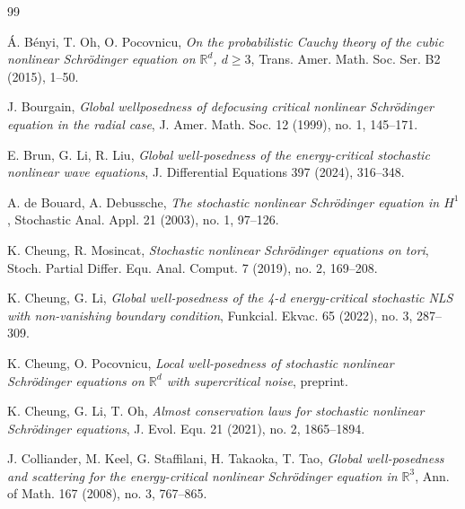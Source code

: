 \documentclass[letterpaper, 11pt,  reqno]{amsart}
\newcommand{\1}{\hspace{0.5mm}\text{I}\hspace{0.5mm}}
\newcommand{\R}{\mathbb{R}}
\numberwithin{equation}{section}
\numberwithin{theorem}{section}
\begin{document}
\begin{thebibliography}{99}
%


\'A. B\'enyi, T. Oh, O. Pocovnicu,
{\it On the probabilistic Cauchy theory of the cubic nonlinear Schr\"odinger equation on $\R^d$, $d\geq3$},
Trans. Amer. Math. Soc. Ser. B2 (2015), 1--50.



J. Bourgain,
{\it Global wellposedness of defocusing critical nonlinear Schr\"odinger equation in the radial case},
J. Amer. Math. Soc. 12 (1999), no. 1, 145--171.



E. Brun, G. Li, R. Liu,
{\it Global well-posedness of the energy-critical stochastic nonlinear wave equations},
J. Differential Equations 397 (2024), 316--348.



A. de Bouard, A. Debussche,
{\it The stochastic nonlinear Schr\"odinger equation in $H^1$},
Stochastic Anal. Appl. 21 (2003), no. 1, 97--126.





K. Cheung, R. Mosincat, 
{\it Stochastic nonlinear Schr\"{o}dinger equations on tori}, 
Stoch. Partial Differ. Equ. Anal. Comput. 7 (2019), no. 2, 169--208.



K. Cheung, G. Li,
{\it Global well-posedness of the 4-d energy-critical stochastic NLS with non-vanishing boundary condition},
Funkcial. Ekvac. 65 (2022), no. 3, 287--309.



K. Cheung, O. Pocovnicu,
{\it Local well-posedness of stochastic nonlinear Schr\"{o}dinger equations on $\R^d$ with supercritical noise}, 
preprint.


K. Cheung, G. Li, T. Oh,
{\it  Almost conservation laws for stochastic nonlinear Schr\"odinger equations},
J. Evol. Equ. 21 (2021), no. 2, 1865--1894.



J. Colliander, M. Keel, G. Staffilani, H. Takaoka, T. Tao,
{\it Global well-posedness and scattering for the energy-critical nonlinear Schr\"odinger equation in $\R^3$},
Ann. of Math. 167 (2008), no. 3, 767--865.


%




\end{thebibliography}
\end{document}

